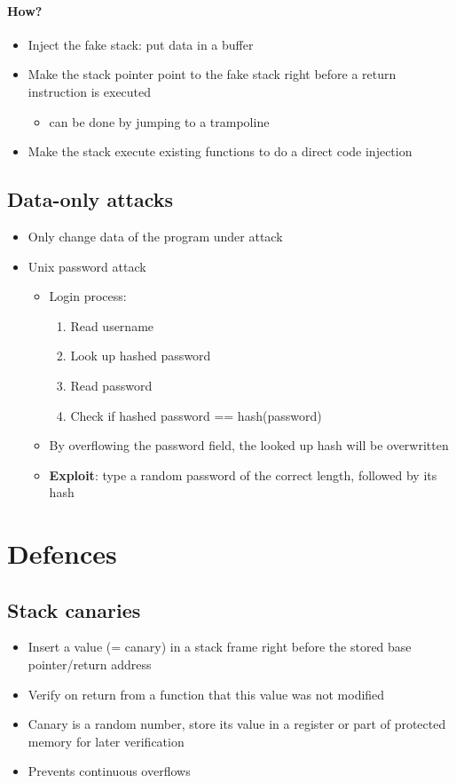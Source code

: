 \documentclass[12pt,titlepage,a4paper]{report}
\begin{document}
	\paragraph{How?}
	\begin{itemize}
		\item Inject the fake stack: put data in a buffer
		\item Make the stack pointer point to the fake stack right before a return instruction is executed
		\begin{itemize}
			\item can be done by jumping to a trampoline
		\end{itemize}
		\item Make the stack execute existing functions to do a direct code injection
	\end{itemize}
	
	\subsection{Data-only attacks}
	\begin{itemize}
		\item Only change data of the program under attack
		\item Unix password attack
		\begin{itemize}
			\item Login process:
			\begin{enumerate}
				\item Read username
				\item Look up hashed password
				\item Read password
				\item Check if hashed password == hash(password)
			\end{enumerate}
			\item By overflowing the password field, the looked up hash will be overwritten
			\item \textbf{Exploit}: type a random password of the correct length, followed by its hash
		\end{itemize}
	\end{itemize}

	\section{Defences}
	\subsection{Stack canaries}
	\begin{itemize}
		\item Insert a value (= canary) in a stack frame right before the stored base pointer/return address
		\item Verify on return from a function that this value was not modified
		\item Canary is a random number, store its value in a register or part of protected memory for later verification
		\item Prevents continuous overflows
	\end{itemize}
	
\end{document}

